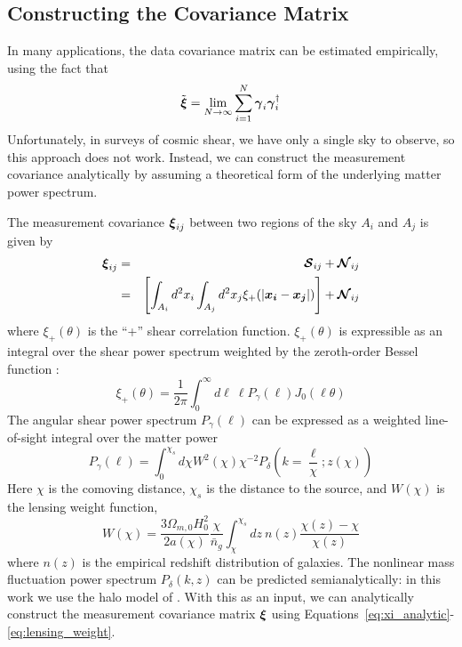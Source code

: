 \subsection{Constructing the Covariance Matrix}
In many applications, the data covariance matrix can be estimated
empirically, using the fact that
\begin{equation}
  \tilde{\boldsymbol{\xi}} = \lim_{N\to\infty} \sum_{i=1}^N 
  \boldsymbol{\gamma}_i \boldsymbol{\gamma}_i^\dagger
\end{equation}
Unfortunately, in surveys of cosmic shear, we have only a single sky to
observe, so this approach does not work.  Instead, we can construct the
measurement covariance analytically by assuming a theoretical form of the
underlying matter power spectrum.

The measurement covariance $\boldsymbol{\xi}_{ij}$ between two regions of the
sky $A_i$ and $A_j$ is given by
\begin{eqnarray}
  \label{eq:xi_analytic}
  \boldsymbol{\xi}_{ij} 
  &=& \boldsymbol{\mathcal{S}}_{ij} + \boldsymbol{\mathcal{N}}_{ij} \nonumber\\
  &=& \left[\int_{A_i}d^2x_i\int_{A_j}d^2x_j 
    \xi_+(|\boldsymbol{x_i}-\boldsymbol{x_j}|)\right]
  + \boldsymbol{\mathcal{N}}_{ij}
\end{eqnarray}
where $\xi_+(\theta)$ is the ``+'' shear correlation function. 
$\xi_+(\theta)$ is expressible as an integral over the shear power spectrum
weighted by the zeroth-order Bessel function
\citep[see, e.g.][]{Schneider02}:
\begin{equation}
  \label{eq:xi_plus_def}
  \xi_+(\theta) 
  = \frac{1}{2\pi} \int_0^\infty d\ell\ \ell P_\gamma(\ell) J_0(\ell\theta)
\end{equation}
The angular shear power spectrum $P_\gamma(\ell)$ can be expressed as a
weighted line-of-sight integral over the matter power
\begin{equation}
  \label{eq:P_gamma}
  P_\gamma(\ell) = \int_0^{\chi_s}d\chi W^2(\chi)\chi^{-2}
  P_\delta\left(k=\frac{\ell}{\chi};z(\chi)\right)
\end{equation}
Here $\chi$ is the comoving distance, $\chi_s$ is the distance to the
source, and $W(\chi)$ is the lensing weight function,
\begin{equation}
  \label{eq:lensing_weight}
  W(\chi) = \frac{3\Omega_{m,0}H_0^2}{2a(\chi)}\frac{\chi}{\bar{n}_g}
  \int_{\chi}^{\chi_s}dz\ n(z) \frac{\chi(z)-\chi}{\chi(z)}
\end{equation}
where $n(z)$ is the empirical redshift distribution of galaxies.
The nonlinear mass fluctuation power spectrum $P_\delta(k, z)$ can be
predicted semianalytically: in this work we use the halo model of
\citet{Smith03}.  With this as an input, we can analytically
construct the measurement covariance matrix $\boldsymbol{\xi}$ using 
Equations~\ref{eq:xi_analytic}-\ref{eq:lensing_weight}.

